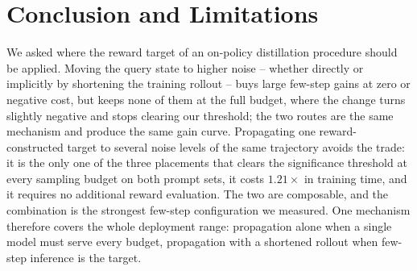 \section{Conclusion and Limitations}
\label{sec:conclusion}

We asked where the reward target of an on-policy distillation procedure should be applied.
Moving the query state to higher noise -- whether directly or implicitly by shortening the
training rollout -- buys large few-step gains at zero or negative cost, but keeps none of
them at the full budget, where the change turns slightly negative and stops clearing our
threshold; the two routes are the same mechanism and produce the same gain curve.
Propagating one reward-constructed target to several noise levels of the same trajectory
avoids the trade: it is the only one of the three placements that clears the significance
threshold at every sampling budget on both prompt sets, it costs $1.21\times$ in training
time, and it requires no additional reward evaluation. The two are composable, and the
combination is the strongest few-step configuration we measured. One mechanism
therefore covers the whole deployment range: propagation alone when a single model must
serve every budget, propagation with a shortened rollout when few-step inference is the
target.

